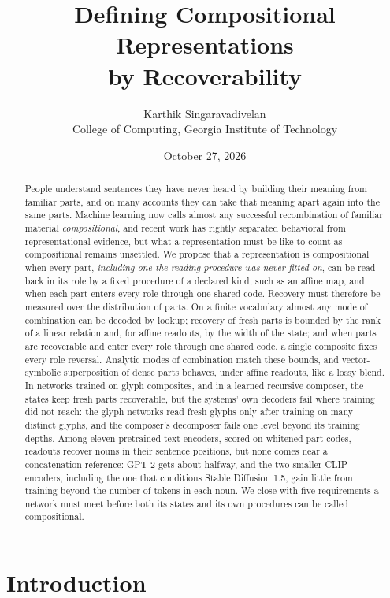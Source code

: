 \documentclass[10pt]{article}
\title{Defining Compositional Representations\\ by Recoverability}
\author{Karthik Singaravadivelan\\ College of Computing, Georgia Institute of Technology}
\date{October 27, 2026}
\theoremstyle{plain}
\theoremstyle{remark}
\begin{document}
\maketitle

\begin{abstract}
People understand sentences they have never heard by building their meaning from familiar parts, and on many accounts they can take that meaning apart again into the same parts. Machine learning now calls almost any successful recombination of familiar material \emph{compositional}, and recent work has rightly separated behavioral from representational evidence, but what a representation must be like to count as compositional remains unsettled. We propose that a representation is compositional when every part, \emph{including one the reading procedure was never fitted on}, can be read back in its role by a fixed procedure of a declared kind, such as an affine map, and when each part enters every role through one shared code. Recovery must therefore be measured over the distribution of parts. On a finite vocabulary almost any mode of combination can be decoded by lookup; recovery of fresh parts is bounded by the rank of a linear relation and, for affine readouts, by the width of the state; and when parts are recoverable and enter every role through one shared code, a single composite fixes every role reversal. Analytic modes of combination match these bounds, and vector-symbolic superposition of dense parts behaves, under affine readouts, like a lossy blend. In networks trained on glyph composites, and in a learned recursive composer, the states keep fresh parts recoverable, but the systems' own decoders fail where training did not reach: the glyph networks read fresh glyphs only after training on many distinct glyphs, and the composer's decomposer fails one level beyond its training depths. Among eleven pretrained text encoders, scored on whitened part codes, readouts recover nouns in their sentence positions, but none comes near a concatenation reference: GPT-2 gets about halfway, and the two smaller CLIP encoders, including the one that conditions Stable Diffusion 1.5, gain little from training beyond the number of tokens in each noun. We close with five requirements a network must meet before both its states and its own procedures can be called compositional.
\end{abstract}

\section{Introduction}
\label{sec:intro}
\end{document}
